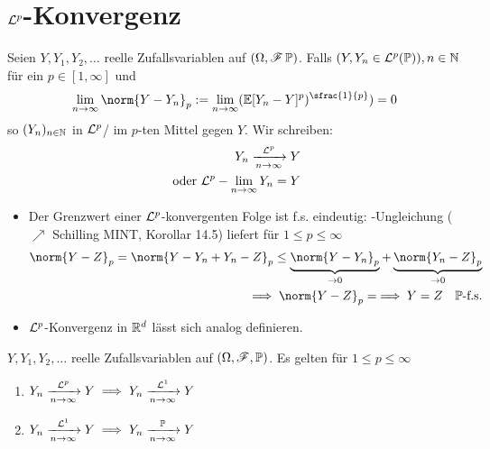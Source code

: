 ﻿\section{$\Ln{p}$-Konvergenz}
\begin{definition}[$\Ln{p}$-Konvergenz]
	Seien $Y,Y_1,Y_2, \dots$ reelle Zufallsvariablen auf $(\Omega,\mathscr F\,\mathbb{P})$. Falls $(Y,Y_n \in \mathcal{L}^{p}(\mathbb{P})), n\in \mathbb{N}$ für ein $p \in [1,\infty]$ und
	\begin{align*}
		\lim_{n \to \infty} \norm{Y-Y_n}_p := \lim_{n \to \infty} 
		(\E[Y_n - Y]^p)^{\sfrac{1}{p}}) = 0
	\end{align*}
	so  $(Y_n)_{n \in \mathbb{N}}$ in $\Ln{p}$/ im $p$-ten Mittel gegen $Y$. Wir schreiben:
	\begin{align*}
		Y_n \xrightarrow[n \to \infty]{\mathcal{L}^{p}} Y\\
		\text{ oder } \mathcal{L}^{p}-\lim_{n \to \infty} Y_n = Y
	\end{align*}
\end{definition}
\begin{*remark}
	\begin{itemize}
		\item Der Grenzwert einer $\Ln{p}$-konvergenten Folge ist f.s. eindeutig: -Ungleichung ($\nearrow$ Schilling MINT, Korollar 14.5) liefert für $1 \le p \le \infty$
		\begin{align*}
			\norm{Y-Z}_p = \norm{Y-Y_n+Y_n - Z}_p \le \underbrace{\norm{Y-Y_n}_p}_{\to 0} + 
			\underbrace{\norm{Y_n-Z}_p}_{\to 0}\\
			\implies \norm{Y-Z}_p = \implies Y=Z \quad \P\text{-f.s.}
		\end{align*}
		\item $\Ln{p}$-Konvergenz in $\mathbb{R}^d$ lässt sich analog definieren.
	\end{itemize}
\end{*remark}
\begin{lemma}
	$Y,Y_1,Y_2,\dots$ reelle Zufallsvariablen auf $(\Omega,\mathscr F,\mathbb{P})$. Es gelten für $1 \le p \le \infty$
	\begin{enumerate}
		\item $Y_n \xrightarrow[n \to \infty]{\mathcal{L}^{p}} Y \implies Y_n \xrightarrow[n \to \infty]{\mathcal{L}^{1}} Y$
		\item $Y_n \xrightarrow[n \to \infty]{\mathcal{L}^{1}} Y\implies Y_n \xrightarrow[n \to \infty]{\mathbb{P}} Y$
	\end{enumerate}
\end{lemma}
